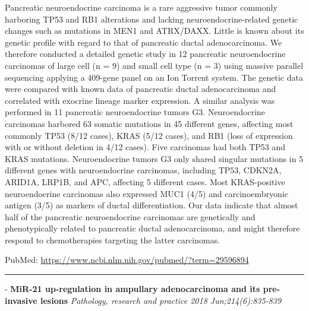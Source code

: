 \documentclass[]{article}
\begin{document}
Pancreatic neuroendocrine carcinoma is a rare aggressive tumor commonly
harboring TP53 and RB1 alterations and lacking neuroendocrine-related
genetic changes such as mutations in MEN1 and ATRX/DAXX. Little is known
about its genetic profile with regard to that of pancreatic ductal
adenocarcinoma. We therefore conducted a detailed genetic study in 12
pancreatic neuroendocrine carcinomas of large cell (n = 9) and small
cell type (n = 3) using massive parallel sequencing applying a 409-gene
panel on an Ion Torrent system. The genetic data were compared with
known data of pancreatic ductal adenocarcinoma and correlated with
exocrine lineage marker expression. A similar analysis was performed in
11 pancreatic neuroendocrine tumors G3. Neuroendocrine carcinomas
harbored 63 somatic mutations in 45 different genes, affecting most
commonly TP53 (8/12 cases), KRAS (5/12 cases), and RB1 (loss of
expression with or without deletion in 4/12 cases). Five carcinomas had
both TP53 and KRAS mutations. Neuroendocrine tumors G3 only shared
singular mutations in 5 different genes with neuroendocrine carcinomas,
including TP53, CDKN2A, ARID1A, LRP1B, and APC, affecting 5 different
cases. Most KRAS-positive neuroendocrine carcinomas also expressed MUC1
(4/5) and carcinoembryonic antigen (3/5) as markers of ductal
differentiation. Our data indicate that almost half of the pancreatic
neuroendocrine carcinomas are genetically and phenotypically related to
pancreatic ductal adenocarcinoma, and might therefore respond to
chemotherapies targeting the latter carcinomas.

PubMed: \url{https://www.ncbi.nlm.nih.gov/pubmed/?term=29596894}

{}

{}

\begin{center}\rule{0.5\linewidth}{\linethickness}\end{center}

 - \textbf{MiR-21 up-regulation in ampullary adenocarcinoma and its
pre-invasive lesions} \emph{Pathology, research and practice 2018
Jun;214(6):835-839}
\end{document}
